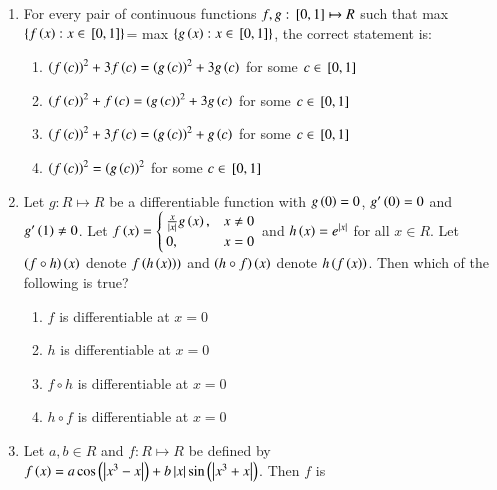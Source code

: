 \documentclass[journal]{IEEEtran}
\numberwithin{equation}{enumi}
\numberwithin{figure}{enumi}
\begin{document}
\begin{enumerate}
    \item 
	  For every pair of continuous functions $f, g: {}\left[0, 1\right]\mapsto R$ such that max $\left\{f\left(x\right): x\in {}\left[0, 1\right]\right\}$= max $\left\{g\left(x\right): x\in {}\left[0, 1\right]\right\}$, the correct statement is: 
    
    \hfill{}
    
    \begin{enumerate}

        \item ${\left(f\left(c\right)\right)}^2+3f\left(c\right)={\left(g\left(c\right)\right)}^2+3g\left(c\right)$ for some $c\in {}\left[0,1\right]$
        \item ${\left(f\left(c\right)\right)}^2+f\left(c\right)={\left(g\left(c\right)\right)}^2+3g\left(c\right)$ for some $c\in {}\left[0,1\right]$
        \item ${\left(f\left(c\right)\right)}^2+3f\left(c\right)={\left(g\left(c\right)\right)}^2+g\left(c\right)$ for some $c\in {}\left[0,1\right]$
        \item ${\left(f\left(c\right)\right)}^2={\left(g\left(c\right)\right)}^2$ for some $c\in {}\left[0,1\right]$ 
    \end{enumerate}


    \item 
	    Let $g: R\mapsto R$ be a differentiable function with $g\left(0\right)=0$, $g^{\prime}\left(0\right)=0$ and $g^{\prime}\left(1\right)\neq 0$. Let $f\left(x\right)=
        \begin{cases}
		\frac{x}{\left\vert x\right\vert}g\left(x\right), & x\neq 0 \\
            0, & x=0
        \end{cases}$ 
	and $h\left(x\right)=e^{\left\vert x\right\vert}$ for all $x\in R$. Let $\left(f\circ h\right)\left(x\right)$ denote $f\left(h\left(x\right)\right))$ and $\left(h\circ f\right)\left(x\right)$ denote $h\left(f\left(x\right)\right)$. Then which of the following is true? 

    \hfill{}
    
    \begin{enumerate}
        
        \item $f$ is differentiable at $x=0$ 
        \item $h$ is differentiable at $x=0$ 
        \item $f\circ h$ is differentiable at $x=0$ 
        \item $h\circ f$ is differentiable at $x=0$  
    \end{enumerate}


    \item 
	    Let $a, b\in R$ and $f: R\mapsto R$ be defined by $f\left(x\right)=a\cos \left(\left\vert x^3-x\right\vert\right) +b\left\vert x\right\vert\sin \left(\left\vert x^3+x\right\vert\right)$. Then $f$ is 
   

\end{enumerate}
\end{document}
